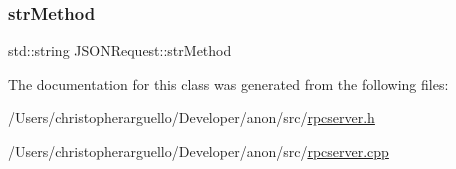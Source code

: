 \subsubsection{\texorpdfstring{str\+Method}{strMethod}}
{\footnotesize\ttfamily std\+::string J\+S\+O\+N\+Request\+::str\+Method}



The documentation for this class was generated from the following files\+:\begin{DoxyCompactItemize}
\item 
/\+Users/christopherarguello/\+Developer/anon/src/\mbox{\hyperlink{rpcserver_8h}{rpcserver.\+h}}\item 
/\+Users/christopherarguello/\+Developer/anon/src/\mbox{\hyperlink{rpcserver_8cpp}{rpcserver.\+cpp}}\end{DoxyCompactItemize}

